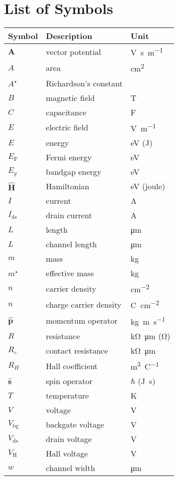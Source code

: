 \chapter*{List of Symbols}
\begin{longtable}[l]{p{125pt} p{150pt} p{150pt}} 
\toprule
	\textbf{Symbol}	& \textbf{Description} & \textbf{Unit} \\ 
\midrule
	$\mathbf{A}$ & vector potential & \si{\volt\second\per\metre}\\
	$A$ & area & \si{\cm\squared}\\
	$A^\star$& Richardson's constant & \si{\ampere\per\second\square\kelvin\square}\\
	$B$ & magnetic field & \si{\tesla}\\
	$C$ & capacitance & \si{\farad}\\
	$E$ & electric field & \si{\volt\per\metre}\\
	$E$ & energy & \si{\electronvolt} (\si{\joule})\\
	$E_\mathrm{F}$  & Fermi energy & \si{\electronvolt}\\
	$E_g$ & bandgap energy & \si{\electronvolt}\\
	$\hat{\mathbf{H}}$ & Hamiltonian & \si{\electronvolt} (\si{joule})\\
	$I$ & current & \si{\ampere}\\
	$I_\mathrm{ds}$ & drain current & \si{\ampere}\\
	$L$ & length & \si{\micro\metre}\\
	$L$ & channel length & \si{\micro\metre}\\
	$m$ & mass & \si{\kg}\\
	$m^\star$ & effective mass & \si{\kg}\\
	$n$ & carrier density & \si{\cm\tothe{-2}}\\
	$n$ & charge carrier density & \si{\coulomb\cm\tothe{-2}}\\
	$\hat{\mathbf{p}}$ & momentum operator & \si{\kg\metre\per\second}\\
	$R$ & resistance & \si{\kilo\ohm\micro\metre} (\si{\ohm})\\
	$R_c$ & contact resistance & \si{\kilo\ohm\micro\metre}\\
	$R_H$ & Hall coefficient & \si{\metre\cubed\per\coulomb}\\
	$\hat{\mathbf{s}}$ & spin operator & $\hbar$ (\si{\joule\second})\\
	$T$ & temperature & \si{\kelvin}\\
	$V$ & voltage & \si{\volt}\\
	$V_\mathrm{bg}$ & backgate voltage & \si{\volt}\\
	$V_\mathrm{ds}$ & drain voltage & \si{\volt}\\
	$V_\mathrm{H}$ & Hall voltage & \si{\volt}\\
	$w$ & channel width & \si{\micro\metre}\\


\end{longtable}
